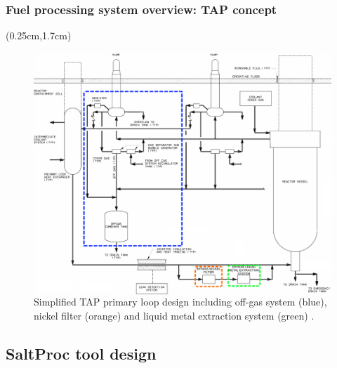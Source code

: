 \begin{frame}
\frametitle{Fuel processing system overview: TAP concept}
\begin{textblock*}{12.4cm}(0.25cm,1.7cm) %
\begin{figure}[htp!] %
	\begin{columns}
			\hspace{+3mm}
		\includegraphics[height=0.88\textheight]{../dissertation/figures/ch4/tap_primary_loop.png}
		
		\caption{Simplified \gls{TAP} primary loop design including off-gas 
		system 
		(blue), nickel filter (orange) and liquid metal extraction system 
		(green) \cite{transatomic_power_transatomic_2019}.}
	\end{columns}
\end{figure}
\end{textblock*}
\end{frame}


\subsection{SaltProc tool design}


